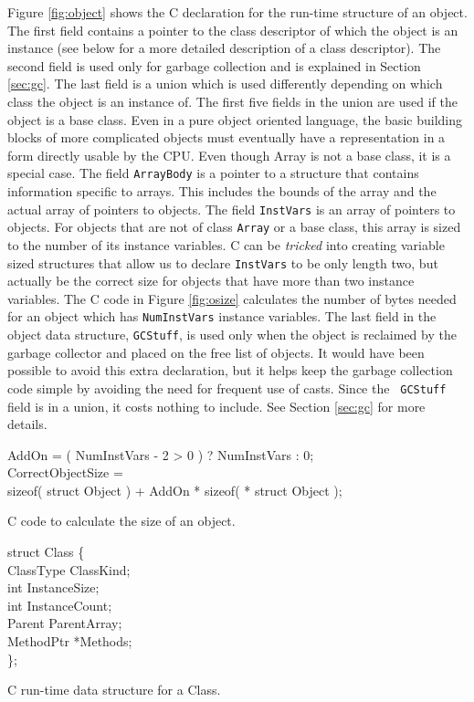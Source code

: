 Figure \ref{fig:object} shows the C declaration for the run-time
structure of an object.  The first field contains a pointer to the
class descriptor of which the object is an instance (see below for
a more detailed description of a class descriptor).  The second field
is used only for garbage collection and is explained in Section
\ref{sec:gc}.  The last field is a union which is used differently
depending on which class the object is an instance of.  The first five
fields in the union are used if the object is a base class.  Even in a
pure object oriented language, the basic building blocks of more
complicated objects must eventually have a representation in a form
directly usable by the CPU.  Even though Array is not a base class, it
is a special case.  The field {\tt ArrayBody} is a pointer to a
structure that contains information specific to arrays.  This includes
the bounds of the array and the actual array of pointers to objects.
The field {\tt InstVars} is an array of pointers to objects.  For
objects that are not of class {\tt Array} or a base class, this array
is sized to the number of its instance variables.  C can be {\em
tricked} into creating variable sized structures that allow us to
declare {\tt InstVars} to be only length two, but actually be the
correct size for objects that have more than two instance variables.
The C code in Figure \ref{fig:osize} calculates the number of bytes
needed for an object which has {\tt NumInstVars} instance variables.
The last field in the object data structure, {\tt GCStuff}, is used
only when the object is reclaimed by the garbage collector and placed
on the free list of objects.  It would have been possible to avoid
this extra declaration, but it helps keep the garbage collection code
simple by avoiding the need for frequent use of casts.  Since the {\tt
GCStuff} field is in a union, it costs nothing to include.  See
Section \ref{sec:gc} for more details.

\begin{shortfigure}
\begin{prog}
\>    AddOn = ( NumInstVars - 2 > 0 ) ? NumInstVars : 0; \\
\>    CorrectObjectSize =  \\
\>\>	sizeof( struct Object ) + AddOn * sizeof( * struct Object );
\end{prog}
\caption{C code to calculate the size of an object.}
\label{fig:osize}
\end{shortfigure}

\begin{shortfigure}
\begin{prog}
\>   struct Class \{        \\
\>\>   ClassType ClassKind; \\
\>\>   int InstanceSize;    \\
\>\>   int InstanceCount;   \\
\>\>   Parent ParentArray;  \\
\>\>   MethodPtr *Methods;  \\
\>   \};
\end{prog}
\caption{C run-time data structure for a Class.}
\label{fig:class}
\end{shortfigure}

